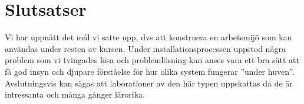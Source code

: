 \section{Slutsatser}
Vi har uppnått det mål vi satte upp, dvs att konstruera en arbetsmijö som kan
användas under resten av kursen. Under installationsprocessen uppstod några
problem som vi tvingades lösa och problemlösning kan anses vara ett bra sätt
att få god insyn och djupare förståelse för hur olika system fungerar ''under
huven''. Avslutningsvis kan sägas att laborationer av den här typen uppskattas
då de är intressanta och många gånger lärorika.
